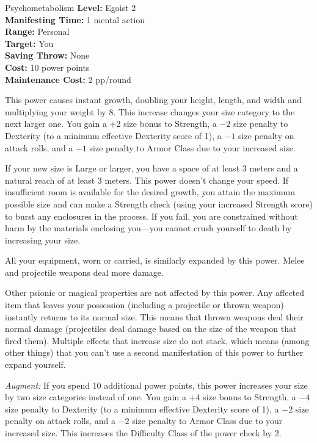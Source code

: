 {Psychometabolism}
{
	\textbf{Level:}
	Egoist 2\\
	\textbf{Manifesting Time:}
	1 mental action\\
	\textbf{Range:}
	Personal\\
	\textbf{Target:}
	You\\
	\textbf{Saving Throw:}
	None\\
	\textbf{Cost:}
	10 power points\\
	\textbf{Maintenance Cost:}
	2 pp/round\\
}
{
	This power causes instant growth, doubling your height, length, and width and multiplying your weight by 8. This increase changes your size category to the next larger one. You gain a +2 size bonus to Strength, a $-2$ size penalty to Dexterity (to a minimum effective Dexterity score of 1), a $-1$ size penalty on attack rolls, and a $-1$ size penalty to Armor Class due to your increased size.

	If your new size is Large or larger, you have a space of at least 3 meters and a natural reach of at least 3 meters. This power doesn't change your speed. If insufficient room is available for the desired growth, you attain the maximum possible size and can make a Strength check (using your increased Strength score) to burst any enclosures in the process. If you fail, you are constrained without harm by the materials enclosing you---you cannot crush yourself to death by increasing your size.

	All your equipment, worn or carried, is similarly expanded by this power. Melee and projectile weapons deal more damage.

	Other psionic or magical properties are not affected by this power. Any affected item that leaves your possession (including a projectile or thrown weapon) instantly returns to its normal size. This means that thrown weapons deal their normal damage (projectiles deal damage based on the size of the weapon that fired them). Multiple effects that increase size do not stack, which means (among other things) that you can't use a second manifestation of this power to further expand yourself.

	\textit{Augment:} If you spend 10 additional power points, this power increases your size by two size categories instead of one. You gain a +4 size bonus to Strength, a $-4$ size penalty to Dexterity (to a minimum effective Dexterity score of 1), a $-2$ size penalty on attack rolls, and a $-2$ size penalty to Armor Class due to your increased size. This increases the Difficulty Class of the power check by 2.
}

